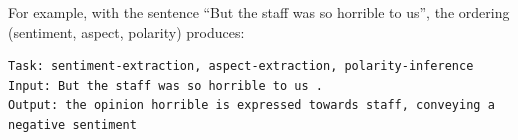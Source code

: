 \documentclass[12pt,a4paper]{report}
\begin{document}
For example, with the sentence ``But the staff was so horrible to us'', the ordering (sentiment, aspect, polarity) produces:

\begin{lstlisting}
Task: sentiment-extraction, aspect-extraction, polarity-inference
Input: But the staff was so horrible to us .
Output: the opinion horrible is expressed towards staff, conveying a negative sentiment
\end{lstlisting}


\clearpage
{}


\end{document}
